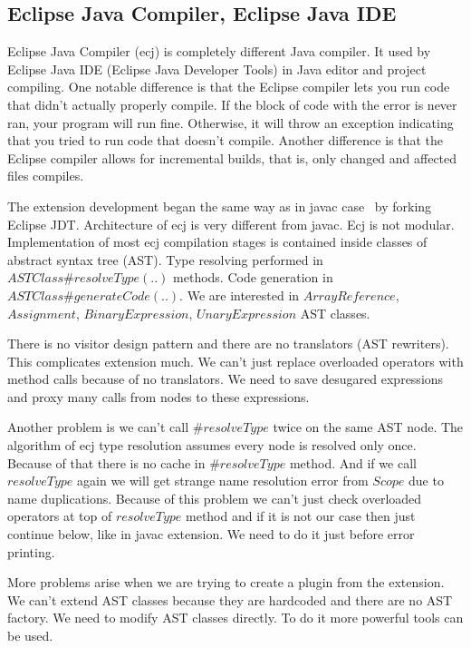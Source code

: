 \documentclass{aircc}
\begin{document}
\subsection{Eclipse Java Compiler, Eclipse Java IDE}

Eclipse Java Compiler (ecj) is completely different Java compiler.
It used by Eclipse Java IDE (Eclipse Java Developer Tools) in Java editor and project compiling.
One notable difference is that the Eclipse compiler lets you run code that didn't actually properly compile. 
If the block of code with the error is never ran, your program will run fine. 
Otherwise, it will throw an exception indicating that you tried to run code that doesn't compile.
Another difference is that the Eclipse compiler allows for incremental builds, that is, only changed and affected files compiles.

The extension development began the same way as in javac case \textemdash~by forking Eclipse JDT\cite{eclipse.jdt-oo}.
Architecture of ecj is very different from javac. Ecj is not modular.
Implementation of most ecj compilation stages is contained inside classes of abstract syntax tree (AST).
Type resolving performed in $ASTClass\#resolveType(..)$ methods.
Code generation in $ASTClass\#generateCode(..)$.
We are interested in $ArrayReference$,  $Assignment$, $BinaryExpression$, $UnaryExpression$ AST classes.

There is no visitor design pattern and there are no translators (AST rewriters).
This complicates extension much.
We can't just replace overloaded operators with method calls because of no translators.
We need to save desugared expressions and proxy many calls from nodes to these expressions.

Another problem is we can't call $\#resolveType$ twice on the same AST node.
The algorithm of ecj type resolution assumes every node is resolved only once.
Because of that there is no cache in $\#resolveType$ method. 
And if we call $resolveType$ again we will get strange name resolution error from $Scope$ due to name duplications.
Because of this problem we can't just check overloaded operators at top of $resolveType$ method
and if it is not our case then just continue below, like in javac extension.
We need to do it just before error printing.

More problems arise when we are trying to create a plugin from the extension.
We can't extend AST classes because they are hardcoded and there are no AST factory.
We need to modify AST classes directly. To do it more powerful tools can be used.
\end{document}
